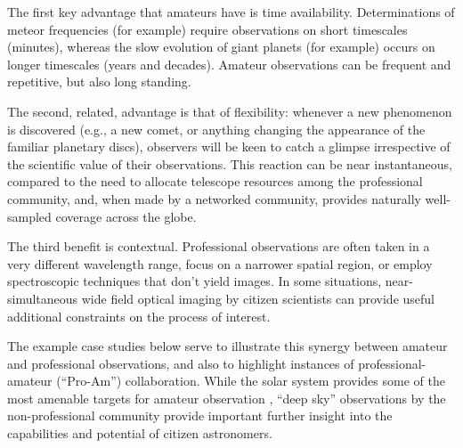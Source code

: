 \documentclass{ar2e}
\begin{document}
The first key advantage that amateurs have is time availability. Determinations
of meteor frequencies (for example) require observations on short timescales
(minutes), whereas the slow evolution of giant planets (for example) occurs on
longer timescales (years and decades).  Amateur observations can be frequent and
repetitive, but also long standing. 

The second, related, advantage is that of flexibility: whenever a new phenomenon
is discovered (e.g., a new comet, or anything changing the appearance of the
familiar planetary discs), observers will be keen to catch a glimpse
irrespective of the scientific value of their observations.  This reaction can
be near instantaneous, compared to the need to allocate telescope resources
among the professional community, and, when made by a networked community,
provides naturally well-sampled coverage across the globe.

The third benefit is contextual.  Professional observations are often taken in a
very different wavelength range, focus on a narrower spatial region, or employ
spectroscopic techniques that don't yield images. In some situations,
near-simultaneous wide field optical imaging by citizen scientists can provide
useful additional constraints on the process of interest.

The example case studies below serve to illustrate this synergy between amateur
and professional observations, and also to highlight instances of
professional-amateur (``Pro-Am'') collaboration. While the solar system provides
some of the most amenable targets for amateur observation \citep{14mousis_proam}, ``deep sky''
observations by the non-professional community provide important further insight
into the capabilities and potential of citizen astronomers.


\end{document}
